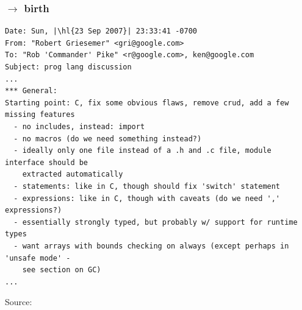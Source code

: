\begin{frame}[t,fragile]
  \frametitle{ $\rightarrow$ birth}

\begin{lstlisting}[language=plain,escapechar=|,basicstyle=\scriptsize\ttfamily]
Date: Sun, |\hl{23 Sep 2007}| 23:33:41 -0700
From: "Robert Griesemer" <gri@google.com>
To: "Rob 'Commander' Pike" <r@google.com>, ken@google.com
Subject: prog lang discussion
...
*** General:
Starting point: C, fix some obvious flaws, remove crud, add a few missing features
  - no includes, instead: import
  - no macros (do we need something instead?)
  - ideally only one file instead of a .h and .c file, module interface should be
    extracted automatically
  - statements: like in C, though should fix 'switch' statement
  - expressions: like in C, though with caveats (do we need ',' expressions?)
  - essentially strongly typed, but probably w/ support for runtime types
  - want arrays with bounds checking on always (except perhaps in 'unsafe mode' -
    see section on GC)
...
\end{lstlisting}

  \fullvfill
  \hfill
  \begin{minipage}{\linewidth}
    \raggedright
    \footnotesize
    Source:
  \end{minipage}

\end{frame}

